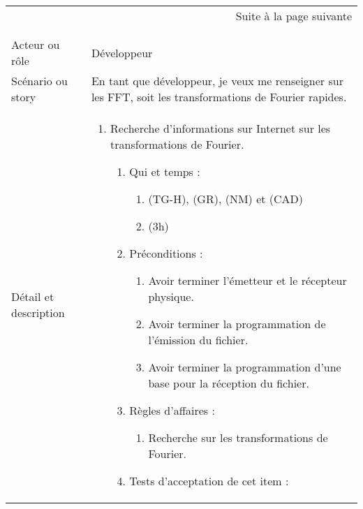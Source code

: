 \begin{longtable}{|l|p{}|}
\multicolumn{2}{r}{Suite à la page suivante} \\
\endfoot

\multicolumn{2}{r}{} \\
\endlastfoot

\hline
    \rowcolor{Gray}
    \multicolumn{2}{|l|}{1} \\
\hline
    Acteur ou rôle & Développeur  \\
\hline
    Scénario ou story & En tant que développeur, je veux me renseigner sur les FFT, soit les transformations de Fourier rapides. \\
\hline
    Détail et description &
        \begin{enumerate}[label*=\arabic*.]
       \item Recherche d'informations sur Internet sur les transformations de Fourier.
            \begin{enumerate}[label*=\arabic*.]
                    \item Qui et temps :
                    \begin{enumerate}[label*=\arabic*.]
                        \item (TG-H), (GR), (NM) et (CAD)
                        \item (3h)
                    \end{enumerate}
                    \item Préconditions :
                    \begin{enumerate}[label*=\arabic*.]
                    \item Avoir terminer l'émetteur et le récepteur physique.
                    \item Avoir terminer la programmation de l'émission du fichier.
                      \item Avoir terminer la programmation d'une base pour la réception du fichier.
                    \end{enumerate}
                    \item Règles d’affaires :
                    \begin{enumerate}[label*=\arabic*.]
                        \item Recherche sur les transformations de Fourier.
                    \end{enumerate}
                    \item Tests d'acceptation de cet item :
                    \begin{enumerate}[label*=\arabic*.]

\end{enumerate}
\end{enumerate}
\end{enumerate}
\end{longtable}

